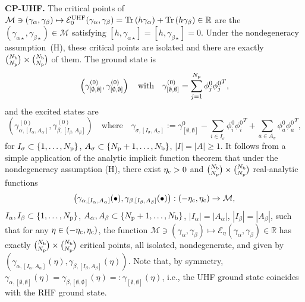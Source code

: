 \documentclass[11pt]{article}
\def\tr{{\rm Tr \,}}
\def\R{{\mathbb R}}
\begin{document}
\medskip

\noindent\textbf{CP-UHF.} The critical points of $\mathcal M \ni (\gamma_\alpha,\gamma_\beta) \mapsto \mathcal E^{\rm UHF}_0(\gamma_\alpha,\gamma_\beta)=\tr(h\gamma_\alpha) +\tr(h\gamma_\beta)   \in \R$ are the $(\gamma_{\alpha\star},\gamma_{\beta\star}) \in \mathcal M$ satisfying $[h,\gamma_{\alpha\star}]=[h,\gamma_{\beta\star}]=0$. Under the nondegeneracy assumption~(H), these critical points are isolated and there are exactly $\binom{N_{\rm b}}{N_{\rm p}} \times \binom{N_{\rm b}}{N_{\rm p}}$ of them. The ground state is 
\begin{equation}
\label{eqn:mean field ground state}
\left(\gamma_{[\emptyset,\emptyset]}^{(0)},\gamma_{[\emptyset,\emptyset]}^{(0)}\right) \quad \mbox{with} \quad \gamma_{[\emptyset,\emptyset]}^{(0)} = \sum_{j=1}^{N_{\rm p}} \phi_j^0 {\phi_j^0}^T,
\end{equation}
and the excited states are
\begin{equation}
\label{eqn:mean field excited states}
\left(\gamma_{\alpha,[I_\alpha,A_\alpha]}^{(0)},\gamma_{\beta,[I_\beta,A_\beta]}^{(0)} \right) \quad \mbox{where} \quad \gamma_{\sigma,[I_\sigma,A_\sigma]}:= \gamma_{[\emptyset,\emptyset]}^0 - \sum_{i \in I_\sigma} \phi_i^0{\phi_i^0}^T + \sum_{a \in A_\sigma} \phi_a^0{\phi_a^0}^T, 
\end{equation}
for $I_\sigma \subset \{1,\ldots,N_{\rm p}\}$, $A_\sigma \subset \{N_{\rm p}+1,\ldots,N_{\rm b}\}$, $|I|=|A| \ge 1$.
It follows from a simple application of the analytic implicit function theorem that under the nondegeneracy assumption (H), there exist $\eta_{\rm c} > 0$ and $\binom{N_{\rm b}}{N_{\rm p}} \times \binom{N_{\rm b}}{N_{\rm p}}$ real-analytic functions 
$$
\left(\gamma_{\alpha,[I_\alpha,A_\alpha]}(\bullet),\gamma_{\beta,[I_\beta,A_\beta]}(\bullet) \right)
:(-\eta_{\rm c},\eta_{\rm c}) \to \mathcal M, 
$$
$I_\alpha,I_\beta \subset \{1,\ldots,N_{\rm p}\}$, $A_\alpha,A_\beta \subset \{N_{\rm p}+1,\ldots,N_{\rm b}\}$, $|I_\alpha|=|A_\alpha|$, $|I_\beta|=|A_\beta|$,
such that for any $\eta \in (-\eta_{\rm c},\eta_{\rm c})$, the function $\mathcal M \ni (\gamma_\alpha,\gamma_\beta) \mapsto \mathcal E_\eta(\gamma_\alpha,\gamma_\beta) \in \R$ has exactly $\binom{N_{\rm b}}{N_{\rm p}} \times \binom{N_{\rm b}}{N_{\rm p}}$ critical points, all isolated, nondegenerate, and given by $\left(\gamma_{\alpha,[I_\alpha,A_\alpha]}(\eta),\gamma_{\beta,[I_\beta,A_\beta]}(\eta) \right)$. Note that, by symmetry, $\gamma_{\alpha,[\emptyset,\emptyset]}(\eta)=\gamma_{\beta,[\emptyset,\emptyset]}(\eta)=:\gamma_{[\emptyset,\emptyset]}(\eta)$, i.e., the UHF ground state coincides with the RHF ground state.
\end{document}

